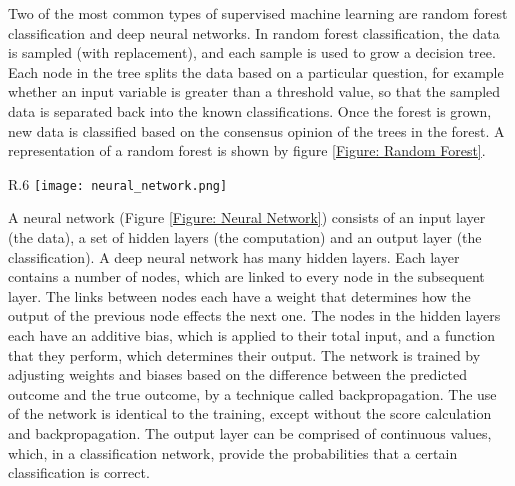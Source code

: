 \documentclass[12pt]{report}
\begin{document}
		Two of the most common types of supervised machine learning are random forest classification and deep neural networks.  In random forest classification, the data is sampled (with replacement), and each sample is used to grow a decision tree.  Each node in the tree splits the data based on a particular question, for example whether an input variable is greater than a threshold value, so that the sampled data is separated back into the known classifications.  Once the forest is grown, new data is classified based on the consensus opinion of the trees in the forest.  A representation of a random forest is shown by figure \ref{Figure: Random Forest}.
		
		\begin{wrapfigure}{R}{.6\textwidth}
			\centering
			\texttt{[image: neural\_network.png]}
			\caption{A simple illustration of a neural network with 3 hidden layers.  Weights are applied on the connections between nodes, and biases are applied on the nodes themselves, before functions are applied}
			\label{Figure: Neural Network}
		\end{wrapfigure}
		A neural network (Figure \ref{Figure: Neural Network}) consists of an input layer (the data), a set of hidden layers (the computation) and an output layer (the classification).  A deep neural network has many hidden layers.  Each layer contains a number of nodes, which are linked to every node in the subsequent layer.  The links between nodes each have a weight that determines how the output of the previous node effects the next one.  The nodes in the hidden layers each have an additive bias, which is applied to their total input, and a function that they perform, which determines their output.  The network is trained by adjusting weights and biases based on the difference between the predicted outcome and the true outcome, by a technique called backpropagation.  The use of the network is identical to the training, except without the score calculation and backpropagation.  The output layer can be comprised of continuous values, which, in a classification network, provide the probabilities that a certain classification is correct. %
		
\end{document}
